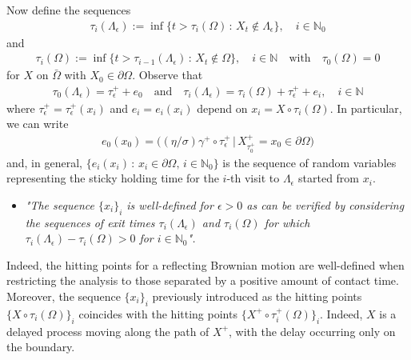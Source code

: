 \documentclass[11pt,a4paper]{article}
\begin{document}
{Now define the sequences
\begin{align*}
\tau_i(\Lambda_\epsilon) := \inf\{t > \tau_i(\Omega)\, :\, X_t \notin  \Lambda_\epsilon \}, \quad i \in \mathbb{N}_0
\end{align*} 
and 
\begin{align*}
\tau_i (\Omega) := \inf\{t > \tau_{i-1}(\Lambda_\epsilon)\, :\, X_t \notin  \Omega \}, \quad i \in \mathbb{N} \quad \textrm{with} \quad \tau_0(\Omega)=0
\end{align*}
for $X$ on $\bar{\Omega}$ with $X_0 \in \partial \Omega$. Observe that
\begin{align*}
\tau_0 (\Lambda_\epsilon) = \tau^+_\epsilon + e_0 \quad \textrm{and} \quad \tau_i (\Lambda_\epsilon) = \tau_i(\Omega) + \tau^+_\epsilon + e_i, \quad i \in \mathbb{N}
\end{align*} 
where $\tau^+_\epsilon = \tau^+_\epsilon (x_i)$ and $e_i=e_i(x_i)$ depend on $x_i=X \circ \tau_i(\Omega)$. In particular, we can write
\begin{align*}
e_0(x_0) = \big( (\eta/\sigma)\gamma^+\circ \tau^+_\epsilon \, | \, X^+_{\tau^+_0} = x_0 \in \partial \Omega \big)
\end{align*}
and, in general, $\{e_i(x_i)\,:\, x_i \in \partial \Omega,\, i \in \mathbb{N}_0\}$ is the sequence of random variables representing the sticky holding time for the $i$-th visit to $\Lambda_\epsilon$ started from $x_i$. 
\begin{itemize}
\item[] \begin{minipage}{0.85\textwidth}
{\it "The sequence $\{x_i\}_i$ is well-defined for $\epsilon >0$ as can be verified by considering the sequences of exit times $\tau_i(\Lambda_\epsilon)$ and $\tau_i(\Omega)$ for which $\tau_i(\Lambda_\epsilon) - \tau_i(\Omega)>0$ for $i \in \mathbb{N}_0$".}
\end{minipage}
\end{itemize}
Indeed, the hitting points for a reflecting Brownian motion are well-defined when restricting the analysis to those separated by a positive amount of contact time. Moreover, the sequence $\{x_i\}_i$ previously introduced as the hitting points $\{X\circ \tau_i(\Omega)\}_i$ coincides with the hitting points $\{X^+ \circ \tau^+_i(\Omega)\}_i$. Indeed, $X$ is a delayed process moving along the path of $X^+$, with the delay occurring only on the boundary. 

}
\end{document}

